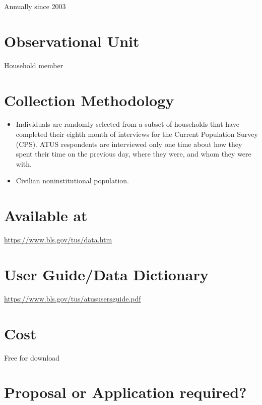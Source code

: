 \documentclass[
]{book}
\providecommand{\tightlist}{%
  \setlength{\itemsep}{0pt}\setlength{\parskip}{0pt}}
\begin{document}
Annually since 2003

\hypertarget{observational-unit-8}{%
\section{Observational Unit}\label{observational-unit-8}}

Household member

\hypertarget{collection-methodology-8}{%
\section{Collection Methodology}\label{collection-methodology-8}}

\begin{itemize}
\tightlist
\item
  Individuals are randomly selected from a subset of households that have completed their eighth month of interviews for the Current Population Survey (CPS). ATUS respondents are interviewed only one time about how they spent their time on the previous day, where they were, and whom they were with.
\item
  Civilian noninstitutional population.
\end{itemize}

\hypertarget{available-at-8}{%
\section{Available at}\label{available-at-8}}

\url{https://www.bls.gov/tus/data.htm}

\hypertarget{user-guidedata-dictionary-8}{%
\section{User Guide/Data Dictionary}\label{user-guidedata-dictionary-8}}

\url{https://www.bls.gov/tus/atususersguide.pdf}

\hypertarget{cost-8}{%
\section{Cost}\label{cost-8}}

Free for download

\hypertarget{proposal-or-application-required-8}{%
\section{Proposal or Application required?}\label{proposal-or-application-required-8}}
\end{document}
